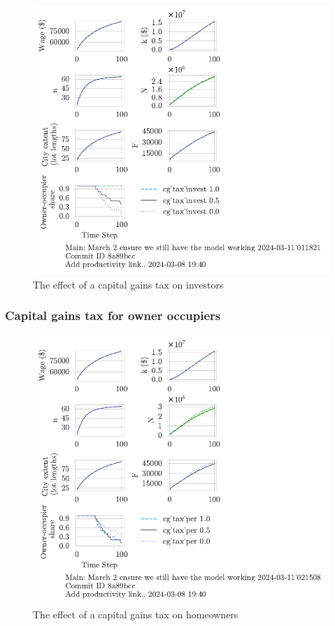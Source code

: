 \begin{figure}[b!]
    \centering
    \includegraphics[scale=.8, trim={0 1.4cm 4cm 0},clip]{fig/cg_tax_invest-Main-011821.pdf}
    \caption{The effect of a capital gains tax on investors}
    \label{fig:CGinvest_ownership_trajectory}
\end{figure}

\newpage

\subsubsection{Capital gains tax for owner occupiers}

\begin{figure}[b!]
    \centering
    \includegraphics[scale=.8, trim={0 1.4cm 0 0},clip]{fig/cg_tax_per-Main-021508.pdf}
    \caption{The effect of a capital gains tax on homeowners}
    \label{fig:CGpers_ownership_trajectory}
\end{figure}

